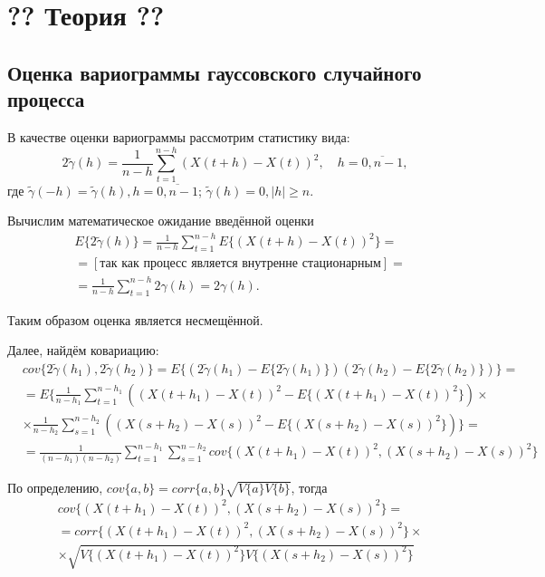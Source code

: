 \newpage

\chapter{?? Теория ??}
\label{c:theory}

\section{Оценка вариограммы гауссовского случайного процесса} %
\label{sec:variogram_theory}

В качестве оценки вариограммы рассмотрим статистику вида:
\begin{equation}
	\label{eq:var_est}
	2 \tilde{\gamma}(h) = \frac{1}{n - h} \sum_{t = 1}^{n - h}(X(t + h) - X(t))^2, \quad h = \overline{0, n - 1},
\end{equation}
где $ \tilde{\gamma}(-h) = \tilde{\gamma}(h), h = \overline{0, n - 1}$; $ \tilde{\gamma}(h) = 0, |h| \ge n $.

Вычислим математическое ожидание введённой оценки
\begin{eqnarray*}
	& E \{ 2 \tilde{\gamma}(h) \} = \frac{1}{n - h} \sum_{t = 1}^{n - h} E \{ (X(t + h) - X(t))^2 \} = \\
	& = [\text{так как процесс является внутренне стационарным}] = \\
	& = \frac{1}{n - h} \sum_{t = 1}^{n - h} 2 \gamma(h) = 2 \gamma(h).
\end{eqnarray*}

Таким образом оценка является несмещённой.

Далее, найдём ковариацию:
\begin{eqnarray}
\label{eq:cov_support}
\nonumber
	& cov\{ 2 \tilde{\gamma}(h_1), 2 \tilde{\gamma}(h_2) \} = E\{ (2 \tilde{\gamma}(h_1) - E\{ 2 \tilde{\gamma}(h_1) \}) (2 \tilde{\gamma}(h_2) - E\{ 2 \tilde{\gamma}(h_2) \}) \} = \\
\nonumber
	& = E\{ \frac{1}{n - h_1} \sum_{t = 1}^{n - h_1}((X(t + h_1) - X(t))^2 - E\{ (X(t + h_1) - X(t))^2 \}) \times \\
\nonumber
	& \times \frac{1}{n - h_2} \sum_{s = 1}^{n - h_2}((X(s + h_2) - X(s))^2 - E\{ (X(s + h_2) - X(s))^2 \}) \} = \\
	& = \frac{1}{(n - h_1)(n - h_2)} \sum_{t = 1}^{n - h_1}\sum_{s = 1}^{n - h_2} cov\{ (X(t + h_1) - X(t))^2, (X(s + h_2) - X(s))^2 \}
\end{eqnarray}

По определению, $ cov\{ a, b \} = corr\{ a, b \} \sqrt{ V\{ a \} V\{ b \} } $, тогда
\begin{eqnarray*}
	& cov\{ (X(t + h_1) - X(t))^2, (X(s + h_2) - X(s))^2 \} = \\
	& = corr\{(X(t + h_1) - X(t))^2, (X(s + h_2) - X(s))^2 \} \times \\
	& \times \sqrt{V\{ (X( t + h_1) - X(t))^2 \} V\{ (X(s + h_2) - X(s))^2 \}}
\end{eqnarray*}

